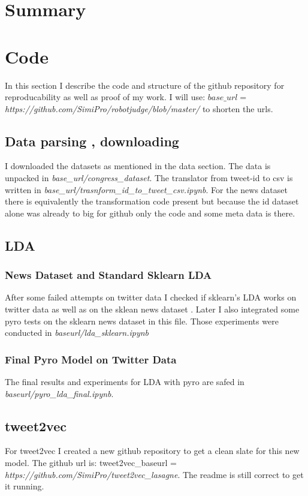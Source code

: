 \documentclass[10pt,conference,compsocconf]{IEEEtran}
\begin{document}
\section{Summary}
\label{sec:Summary}

\section{Code}
\label{sec:Code}
In this section I describe the code and structure of the github repository for reproducability as well as proof of my work. I will use: $base\_url =$ \textit{https://github.com/SimiPro/robotjudge/blob/master/} to shorten the urls. 

\subsection{Data parsing , downloading}
I downloaded the datasets as mentioned in the data section. The data is unpacked in \textit{base\_url/congress\_dataset}. The translator from tweet-id to csv is written in \textit{base\_url/trasnform\_id\_to\_tweet\_csv.ipynb}. For the news dataset there is equivalently the transformation code present but because the id dataset alone was already to big for github only the code and some meta data is there. 

\subsection{LDA}
\subsubsection{News Dataset and Standard Sklearn LDA}
After some failed attempts on twitter data I checked if sklearn's LDA works on twitter data as well as on the sklean news dataset \cite{sklearn_newsdataset}. Later I also integrated some pyro tests on the sklearn news dataset in this file. Those experiments were conducted in \textit{baseurl/lda\_sklearn.ipynb}
\subsubsection{Final Pyro Model on Twitter Data}
The final results and experiments for LDA with pyro are safed in \textit{baseurl/pyro\_lda\_final.ipynb}.

\subsection{tweet2vec}
For tweet2vec I created a new github repository to get a clean slate for this new model. The github url is: tweet2vec\_baseurl = \textit{https://github.com/SimiPro/tweet2vec\_lasagne}. The readme is still correct to get it running.
\end{document}
